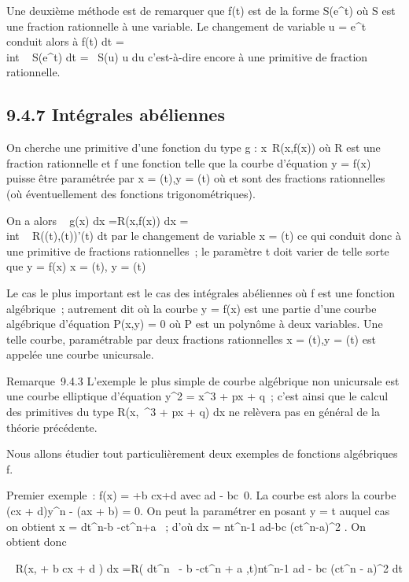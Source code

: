\documentclass[]{article}
\begin{document}
Une deuxième méthode est de remarquer que f(t) est de la forme
S(e^t) où S est une fraction rationnelle à une variable. Le
changement de variable u = e^t conduit alors à
\int  f(t) dt =\\int ~
S(e^t) dt =\int ~  S(u)
\over u du c'est-à-dire encore à une primitive de
fraction rationnelle.

\subsection{9.4.7 Intégrales abéliennes}

On cherche une primitive d'une fonction du type g :
x\mapsto~R(x,f(x)) où R est une fraction rationnelle
et f une fonction telle que la courbe d'équation y = f(x) puisse être
paramétrée par x = \phi(t),y = \psi(t) où \phi et \psi sont des fractions
rationnelles (où éventuellement des fonctions trigonométriques).

On a alors \int ~ g(x) dx
=\int  R(x,f(x)) dx =\\int ~
R(\phi(t),\psi(t))\phi'(t) dt par le changement de variable x = \phi(t) ce qui
conduit donc à une primitive de fractions rationnelles~; le paramètre t
doit varier de telle sorte que y = f(x) \Leftrightarrow x =
\phi(t), y = \psi(t)

Le cas le plus important est le cas des intégrales abéliennes où f est
une fonction algébrique~; autrement dit où la courbe y = f(x) est une
partie d'une courbe algébrique \Gamma d'équation P(x,y) = 0 où P est un
polynôme à deux variables. Une telle courbe, paramétrable par deux
fractions rationnelles x = \phi(t),y = \psi(t) est appelée une courbe
unicursale.

Remarque~9.4.3 L'exemple le plus simple de courbe algébrique non
unicursale est une courbe elliptique d'équation y^2 =
x^3 + px + q~; c'est ainsi que le calcul des primitives du
type \int  R(x,\sqrtx~^3
 + px + q) dx ne relèvera pas en général de la théorie précédente.

Nous allons étudier tout particulièrement deux exemples de fonctions
algébriques f.

Premier exemple~: f(x) = \rootn
\ofax+b \over cx+d  avec ad -
bc\neq~0. La courbe \Gamma est alors la courbe (cx +
d)y^n - (ax + b) = 0. On peut la paramétrer en posant y = t
auquel cas on obtient x = dt^n-b \over
-ct^n+a ~; d'où dx = nt^n-1 ad-bc
\over (ct^n-a)^2 . On obtient
donc

\int ~ R(x,\rootn
\ofax + b \over cx + d ) dx
=\int  R( dt^n~ - b
\over -ct^n + a ,t)nt^n-1 ad -
bc \over (ct^n - a)^2 dt
\end{document}
